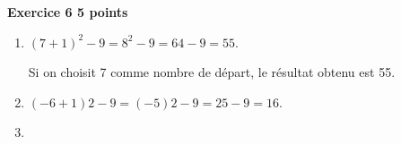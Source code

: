 \textbf{Exercice 6 \hfill 5 points}

\medskip

%

\begin{enumerate}
\item %
$(7 + 1)^2 - 9 = 8^2 - 9 = 64 - 9 = 55$.

Si on choisit 7 comme nombre de départ, le résultat obtenu est 55.
\item %
$(- 6 + 1)2 - 9 = (- 5)2 -  9 = 25 - 9 = 16$.

\item %



\end{enumerate}
